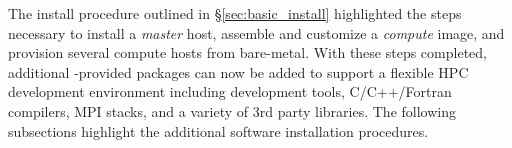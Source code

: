 The install procedure outlined in \S\ref{sec:basic_install} highlighted the
steps necessary to install a {\em master} host, assemble and customize a {\em
  compute} image, and provision several compute hosts from bare-metal. With
these steps completed, additional \OHPC{}-provided packages can now be added to
support a flexible HPC development environment including development tools,
C/C++/Fortran compilers, MPI stacks, and a variety of 3rd party libraries. The
following subsections highlight the additional software installation
procedures.

